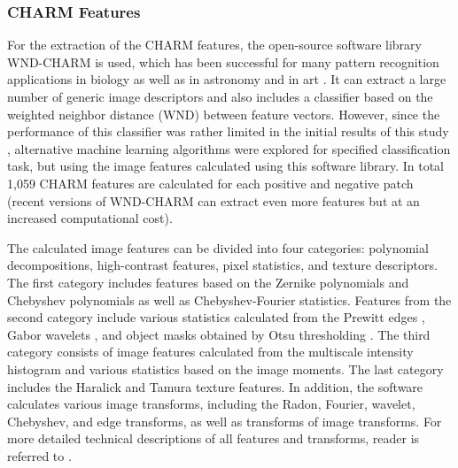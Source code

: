 \subsubsection{CHARM Features}
\label{subsubsec:wnd-chrm}
For the extraction of the CHARM features, the open-source software library WND-CHARM \cite{shamir2008wndchrm, orlov2008wnd} is used, which has been successful for many pattern recognition applications in biology \cite{shamir2010pattern, uhlmann2016cp} as well as in astronomy \cite{shamir2012automatic, kuminski2014combining} and in art \cite{shamir2012computer}. It can extract a large number of generic image descriptors and also includes a classifier based on the weighted neighbor distance (WND) between feature vectors. However, since the performance of this classifier was rather limited in the initial results of this study \cite{mata2016automatic}, alternative machine learning algorithms were explored for specified classification task, but using the image features calculated using this software library. In total 1,059 CHARM features are calculated for each positive and negative patch (recent versions of WND-CHARM can extract even more features but at an increased computational cost).

The calculated image features can be divided into four categories: polynomial decompositions, high-contrast features, pixel statistics, and texture descriptors. The first category includes features based on the Zernike polynomials and Chebyshev polynomials \cite{gradshteyn2014table} as well as Chebyshev-Fourier statistics. Features from the second category include various statistics calculated from the Prewitt edges \cite{prewitt1970object}, Gabor wavelets \cite{gabor1946theory}, and object masks obtained by Otsu thresholding \cite{otsu1979threshold}. The third category consists of image features calculated from the multiscale intensity histogram \cite{hadjidemetriou2001spatial} and various statistics based on the image moments. The last category includes the Haralick \cite{haralick1973textural} and Tamura \cite{tamura1978textural} texture features. In addition, the software calculates various image transforms, including the Radon, Fourier, wavelet, Chebyshev, and edge transforms, as well as transforms of image transforms. For more detailed technical descriptions of all features and transforms, reader is referred to \cite{orlov2008wnd}.

